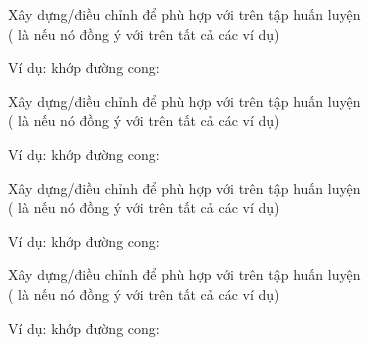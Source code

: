 \documentclass{article}
\begin{document}
\begin{huge}
\vspace*{0.2in}

\textwidth
{}


Xây dựng/điều chỉnh  để phù hợp với  trên tập huấn luyện \\
( là  nếu nó đồng ý với  trên tất cả các ví dụ)

Ví dụ: khớp đường cong:

\vspace*{0.2in}

\textwidth
{}


Xây dựng/điều chỉnh  để phù hợp với  trên tập huấn luyện \\
( là  nếu nó đồng ý với  trên tất cả các ví dụ)

Ví dụ: khớp đường cong:

\vspace*{0.2in}

\textwidth
{}


Xây dựng/điều chỉnh  để phù hợp với  trên tập huấn luyện \\
( là  nếu nó đồng ý với  trên tất cả các ví dụ)

Ví dụ: khớp đường cong:

\vspace*{0.2in}

\textwidth
{}


Xây dựng/điều chỉnh  để phù hợp với  trên tập huấn luyện \\
( là  nếu nó đồng ý với  trên tất cả các ví dụ)

Ví dụ: khớp đường cong:


\end{huge}
\end{document}
